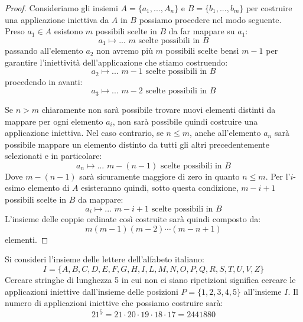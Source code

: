 \begin{proof}
	Consideriamo gli insiemi $A=\{a_{1},...,A_{n}\}$ e $B=\{b_{1},...,b_{m}\}$ per costruire una applicazione iniettiva da $A$ in $B$ possiamo procedere nel modo seguente. Preso $a_{1}\in A$ esistono $m$ possibili scelte in $B$ da far mappare su $a_{1}$:
	\begin{displaymath}
		a_{1} \mapsto \mbox{... $m$ scelte possibili in $B$}
	\end{displaymath}
	passando all'elemento $a_{2}$ non avremo più $m$ possibili scelte bensì $m-1$ per garantire l'iniettività dell'applicazione che stiamo costruendo:
	\begin{displaymath}
		a_{2} \mapsto \mbox{... $m-1$ scelte possibili in $B$}
	\end{displaymath}
	procedendo in avanti:
	\begin{displaymath}
		a_{3} \mapsto \mbox{... $m-2$ scelte possibili in $B$}
	\end{displaymath}
	
	Se $n>m$ chiaramente non sarà possibile trovare nuovi elementi distinti da mappare per ogni elemento $a_{i}$, non sarà possibile quindi costruire una applicazione iniettiva. Nel caso contrario, se $n \leq m$, anche all'elemento $a_{n}$ sarà possibile mappare un elemento distinto da tutti gli altri precedentemente selezionati e in particolare:
	\begin{displaymath}
		a_{n} \mapsto \mbox{... $m-(n-1)$ scelte possibili in $B$}
	\end{displaymath}
	Dove $m-(n-1)$ sarà sicuramente maggiore di zero in quanto $n\leq m$. Per l'$i$-esimo elemento di $A$ esisteranno quindi, sotto questa condizione, $m-i+1$ possibili scelte in $B$ da mappare:
	\begin{displaymath}
		a_{i} \mapsto \mbox{... $m-i+1$ scelte possibili in $B$}
	\end{displaymath}
	L'insieme delle coppie ordinate così costruite sarà quindi composto da:
	\begin{displaymath}
		m(m-1)(m-2)\cdots(m-n+1)
	\end{displaymath}
	elementi.
\end{proof}

\begin{example}
	Si consideri l'insieme delle lettere dell'alfabeto italiano:
	\begin{displaymath}
		I = \{A,B,C,D,E,F,G,H,I,L,M,N,O,P,Q,R,S,T,U,V,Z\}
	\end{displaymath}
	Cercare stringhe di lunghezza 5 in cui non ci siano ripetizioni significa cercare le applicazioni iniettive dall'insieme delle posizioni $P=\{1,2,3,4,5\}$ all'insieme $I$. Il numero di applicazioni iniettive che possiamo costruire sarà:
	\begin{displaymath}
		21^{\underline{5}}=21 \cdot 20 \cdot 19 \cdot 18 \cdot 17 =2441880
	\end{displaymath}
\end{example}


